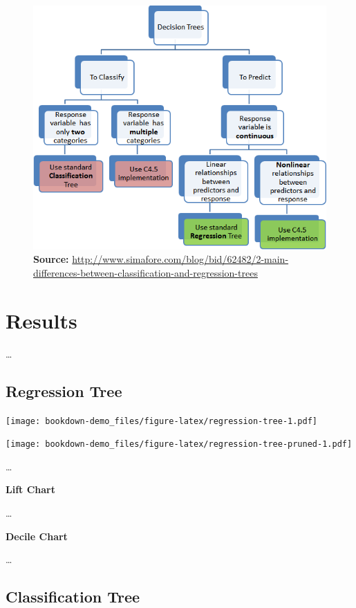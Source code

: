 \documentclass[12pt,openany]{book}
\begin{document}
\begin{figure}[htbp]
\centering
\includegraphics{img/04-decision-tree-flowchart.png}
\caption{\textbf{Source:}
\url{http://www.simafore.com/blog/bid/62482/2-main-differences-between-classification-and-regression-trees}}
\end{figure}

\chapter{Results}\label{results}

\ldots{}

\section{Regression Tree}\label{regression-tree}

\texttt{[image: bookdown-demo\_files/figure-latex/regression-tree-1.pdf]}

\texttt{[image: bookdown-demo\_files/figure-latex/regression-tree-pruned-1.pdf]}

\ldots{}

\textbf{Lift Chart}

\ldots{}

\textbf{Decile Chart}

\ldots{}

\section{Classification Tree}\label{classification-tree}
\end{document}
